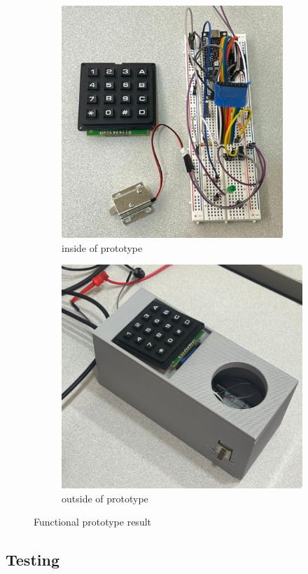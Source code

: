 \begin{figure}[!ht]
\centering
\begin{subfigure}{.5\textwidth}
  \centering
  \includegraphics[width=.7\linewidth]{img/prototypeInside.png}
  \caption{inside of prototype}
  \label{fig:prototypeInside}
\end{subfigure}%
\begin{subfigure}{.5\textwidth}
  \centering
  \includegraphics[width=.7\linewidth]{img/prototypeOutside.png}
  \caption{outside of prototype}
  \label{fig:prototypeOutside}
\end{subfigure}
\caption{Functional prototype result}
\label{fig:test}
\end{figure}


\subsection{Testing}
